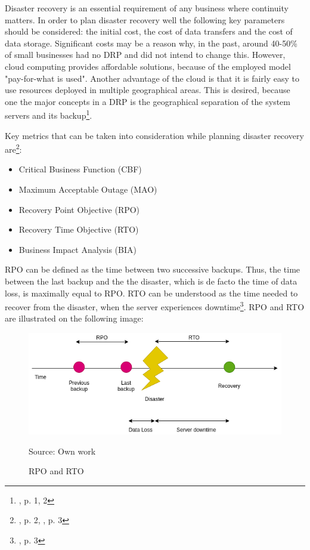 {Disaster recovery is an essential requirement of any business where continuity matters. In order to plan disaster recovery well the following key parameters should be considered: the initial cost, the cost of data transfers and the cost of data storage. Significant costs may be a reason why, in the past, around 40-50\% of small businesses had no DRP and did not intend to change this. However, cloud computing provides affordable solutions, because of the employed model "pay-for-what is used". Another advantage of the cloud is that it is fairly easy to use resources deployed in multiple geographical areas. This is desired, because one the major concepts in a DRP is the geographical separation of the system servers and its backup\footnote{\cite{article-dr-cloud}, p. 1, 2}.

Key metrics that can be taken into consideration while planning disaster recovery are\footnote{\cite{article-dr}, p. 2, \cite{article-dr-cloud}, p. 3}:
\begin{itemize}
\item Critical Business Function (CBF)
\item Maximum Acceptable Outage (MAO)
\item Recovery Point Objective (RPO)
\item Recovery Time Objective (RTO)
\item Business Impact Analysis (BIA)
\end{itemize}
RPO can be defined as the time between two successive backups. Thus, the time between the last backup and the the disaster, which is de facto the time of data loss, is maximally equal to RPO. RTO can be understood as the time needed to recover from the disaster, when the server experiences downtime\footnote{\cite{article-dr-cloud}, p. 3}. RPO and RTO are illustrated on the following image:
\begin{figure}[H]
    \centering
    \includegraphics[width=13cm]{figures/rpo-rto.png}
    \label{fig:rpo-rto}
    \caption{RPO and RTO}
    \small{Source: Own work}
\end{figure}

}
